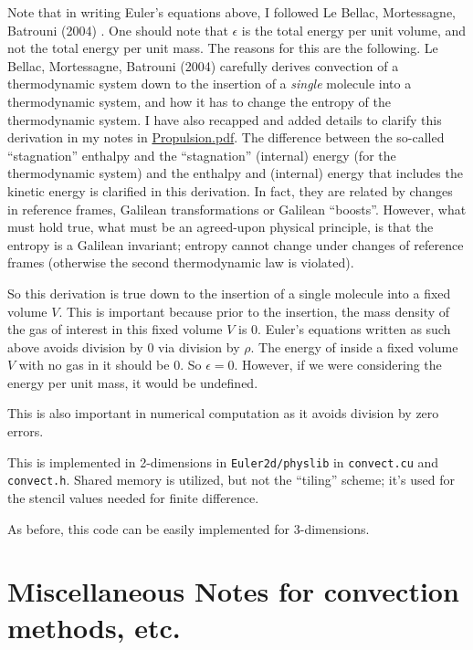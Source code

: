 \documentclass[10pt]{amsart}
\begin{document}
Note that in writing Euler's equations above, I followed Le Bellac, Mortessagne, Batrouni (2004) \cite{MLeBellacFMortessagneGBatrouni2004}.  One should note that $\epsilon$ is the total energy per unit volume, and not the total energy per unit mass.  The reasons for this are the following.  Le Bellac, Mortessagne, Batrouni (2004) \cite{MLeBellacFMortessagneGBatrouni2004} carefully derives convection of a thermodynamic system down to the insertion of a \emph{single} molecule into a thermodynamic system, and how it has to change the entropy of the thermodynamic system.  I have also recapped and added details to clarify this derivation in my notes in \href{https://github.com/ernestyalumni/Propulsion/blob/master/LaTeXandpdfs/Propulsion.pdf}{Propulsion.pdf}.  The difference between the so-called ``stagnation'' enthalpy and the ``stagnation'' (internal) energy (for the thermodynamic system) and the enthalpy and (internal) energy that includes the kinetic energy is clarified in this derivation.  In fact, they are related by changes in reference frames, Galilean transformations or Galilean ``boosts''.  However, what must hold true, what must be an agreed-upon physical principle, is that the entropy is a Galilean invariant; entropy cannot change under changes of reference frames (otherwise the second thermodynamic law is violated).

So this derivation is true down to the insertion of a single molecule into a fixed volume $V$.  This is important because prior to the insertion, the mass density of the gas of interest in this fixed volume $V$ is $0$.  Euler's equations written as such above avoids division by $0$ via division by $\rho$.  The energy of inside a fixed volume $V$ with no gas in it should be $0$.  So $\epsilon =0$.  However, if we were considering the energy per unit mass, it would be undefined.

This is also important in numerical computation as it avoids division by zero errors.

This is implemented in 2-dimensions in \verb|Euler2d/physlib| in \verb|convect.cu| and \verb|convect.h|.  Shared memory is utilized, but not the ``tiling'' scheme; it's used for the stencil values needed for finite difference.

As before, this code can be easily implemented for 3-dimensions.  

\section{Miscellaneous Notes for convection methods, etc.}
\end{document}
